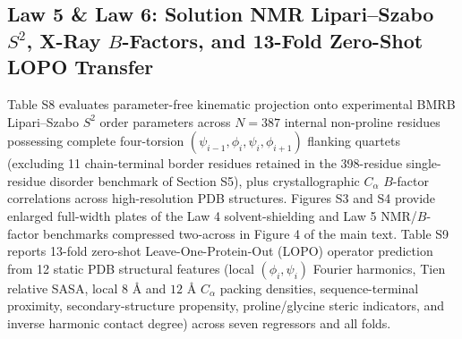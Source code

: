 \documentclass[10pt,letterpaper]{article}
\begin{document}
\begin{table}[!htbp]
\vspace{5pt}
\end{table}

\subsection{Law 5 \& Law 6: Solution NMR Lipari--Szabo $S^2$, X-Ray $B$-Factors, and 13-Fold Zero-Shot LOPO Transfer}
Table S8 evaluates parameter-free kinematic projection onto experimental BMRB Lipari--Szabo $S^2$ order parameters across $N = 387$ internal non-proline residues possessing complete four-torsion $(\psi_{i-1},\phi_i,\psi_i,\phi_{i+1})$ flanking quartets (excluding 11 chain-terminal border residues retained in the 398-residue single-residue disorder benchmark of Section S5), plus crystallographic $C_\alpha$ $B$-factor correlations across \vFourBFactorCount{} high-resolution PDB structures. Figures S3 and S4 provide enlarged full-width plates of the Law 4 solvent-shielding and Law 5 NMR/$B$-factor benchmarks compressed two-across in Figure 4 of the main text. Table S9 reports 13-fold zero-shot Leave-One-Protein-Out (LOPO) operator prediction from 12 static PDB structural features (local $(\phi_i,\psi_i)$ Fourier harmonics, Tien relative SASA, local $8\text{ \AA}$ and $12\text{ \AA}$ $C_\alpha$ packing densities, sequence-terminal proximity, secondary-structure propensity, proline/glycine steric indicators, and inverse harmonic contact degree) across seven regressors and all \vFourNumProteins{} folds.
\end{document}
